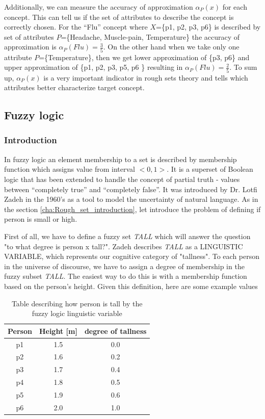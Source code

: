 Additionally, we can measure the accuracy of approximation $\alpha_P(x)$ for each concept.
This can tell us if the set of attributes to describe the concept is correctly
chosen. For the ``Flu'' concept where $X$=\{p1, p2, p3, p6\} is described by
set of attributes $P$=\{Headache, Muscle-pain, Temperature\} the accuracy of
approximation is $\alpha_P(Flu) = \frac{3}{5}$. On the other hand when we take
only one attribute $P$=\{Temperature\}, then we get lower approximation of \{p3,
p6\} and upper approximation of \{p1, p2, p3, p5, p6 \} resulting in
$\alpha_P(Flu) = \frac{2}{5}$. To sum up, $\alpha_P(x)$ is a very important indicator in
rough sets theory and tells which attributes better characterize target
concept. 


\subsection{Fuzzy logic}
\label{cha:Fuzzy_logic}
\subsubsection{Introduction}
In fuzzy logic an element membership to a set is described by membership function 
which assigns value from interval $<0, 1>$. It is a superset of Boolean logic that 
has been extended to handle the concept of partial truth - values between ``completely 
true'' and ``completely false''. It was introduced by Dr. Lotfi Zadeh in the
1960's as a tool to model the uncertainty of natural language. As in the
section \ref{cha:Rough_set_introduction}, let introduce the problem of defining 
if person is small or high. 

First of all, we have to define a fuzzy set \textit{TALL} which will answer the question 
"to what degree is person x tall?". Zadeh describes \textit{TALL} as a LINGUISTIC VARIABLE, 
which represents our cognitive category of "tallness". To each person in the universe of discourse, 
we have to assign a degree of membership in the fuzzy subset \textit{TALL}. The easiest way to do this
is with a membership function based on the person's height. Given this definition, here are some example values
\begin{table}[H]
    \centering
    \caption{Table describing how person is tall by the fuzzy logic linguistic
    variable}
    \begin{tabular}{|c|c|c|}
        \hline
        Person & Height [m] & degree of tallness \\ \hline \hline
        p1 & 1.5 & 0.0 \\ \hline
        p2 & 1.6 & 0.2 \\ \hline
        p3 & 1.7 & 0.4 \\ \hline
        p4 & 1.8 & 0.5 \\ \hline
        p5 & 1.9 & 0.6 \\ \hline
        p6 & 2.0 & 1.0 \\ \hline
    \end{tabular}
    \label{tab:fuzzy_logic_example}
\end{table}

